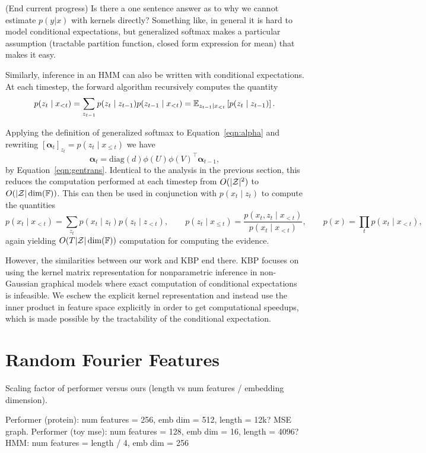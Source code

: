 \documentclass{article}
\begin{document}
(End current progress)
Is there a one sentence answer as to why we cannot estimate $p(y|x)$ with kernels directly?
Something like, in general it is hard to model conditional expectations, but
generalized softmax makes a particular assumption (tractable partition function,
closed form expression for mean) that makes it easy.

Similarly, inference in an HMM can also be written with conditional expectations.
At each timestep, the forward algorithm recursively computes the quantity
\begin{equation}
\label{eqn:alpha}
p(z_t \mid x_{<t})
= \sum_{z_{t-1}} p(z_t \mid z_{t-1})p(z_{t-1}\mid x_{<t})
= \mathbb{E}_{z_{t-1}\mid x_{<t}}\left[p(z_t \mid z_{t-1})\right].
\end{equation}

Applying the definition of generalized softmax to Equation~\ref{eqn:alpha}
and rewriting $[\bm\alpha_t]_{z_t} = p(z_t \mid x_{\le t})$
we have
\begin{equation}
\bm\alpha_t = \textrm{diag}(d)\phi(U)\phi(V)^\top\bm\alpha_{t-1},
\end{equation}
by Equation~\ref{eqn:gentrans}.
Identical to the analysis in the previous section, this reduces the computation
performed at each timestep from $O(|\mathcal{Z}|^2)$ to $O(|\mathcal{Z}|\dim(\mathbb{F}))$.
This can then be used in conjunction with $p(x_t \mid z_t)$ to compute
the quantities
$$
p(x_t \mid x_{<t}) = \sum_{z_t}p(x_t \mid z_t)p(z_t \mid z_{<t}),
\qquad
p(z_t \mid x_{\le t}) = \frac{p(x_t, z_t \mid x_{<t})}{p(x_t \mid x_{<t})},
\qquad
p(x) = \prod_t p(x_t \mid x_{<t}),
$$
again yielding $O(T|\mathcal{Z}|\dim(\mathbb{F}))$ computation for computing the evidence.

However, the similarities between our work and KBP end there.
KBP focuses on using the kernel matrix representation for nonparametric inference
in non-Gaussian graphical models where exact computation of conditional expectations is
infeasible.
We eschew the explicit kernel representation and
instead use the inner product in feature space explicitly in order to get
computational speedups,
which is made possible by the tractability of the conditional expectation.

\section{Random Fourier Features}
Scaling factor of performer versus ours (length vs num features / embedding dimension).

Performer (protein): num features = 256, emb dim = 512, length = 12k?
MSE graph.
Performer (toy mse): num features = 128, emb dim = 16, length = 4096?
HMM: num features = length / 4, emb dim = 256
\end{document}
